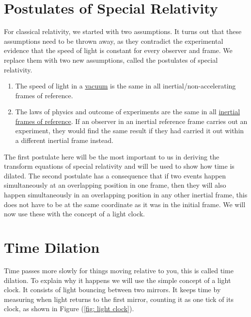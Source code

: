 \section{Postulates of Special Relativity} \label{sect: Postulates of Special Relativity}

For classical relativity, we started with two assumptions. It turns out that these assumptions need to be thrown away, as they contradict the experimental evidence that the speed of light is constant for every observer and frame. We replace them with two new assumptions, called the postulates of special relativity.

\begin{tcolorbox}%
	\begin{enumerate}
		\item The speed of light in a \hyperlink{def-vacuum}{vacuum} is the same in all inertial/non-accelerating frames of reference.
		\item The laws of physics and outcome of experiments are the same in all \hyperlink{def-Inertial-reference-frame}{inertial frames of reference}. If an observer in an inertial reference frame carries out an experiment, they would find the same result if they had carried it out within a different inertial frame instead.
	\end{enumerate}
\end{tcolorbox}

The first postulate here will be the most important to us in deriving the transform equations of special relativity and will be used to show how time is dilated. The second postulate has a consequence that if two events happen simultaneously at an overlapping position in one frame, then they will also happen simultaneously in an overlapping position in any other inertial frame, this does not have to be at the same coordinate as it was in the initial frame.
We will now use these with the concept of a light clock.

\section{Time Dilation} \label{sect: Time Dilation}

Time passes more slowly for things moving relative to you, this is called time dilation.
To explain why it happens we will use the simple concept of a light clock.
It consists of light bouncing between two mirrors.
It keeps time by measuring when light returns to the first mirror, counting it as one tick of its clock, as shown in Figure (\ref{fig: light clock}).

